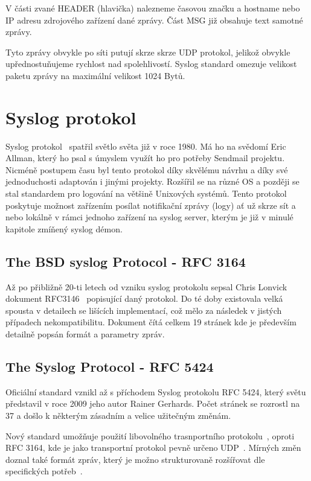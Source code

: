 \documentclass[thesis=B,czech]{FITthesis}[2012/06/26]
\begin{document}
V části zvané HEADER (hlavička) nalezneme časovou značku a hostname nebo IP adresu zdrojového zařízení dané zprávy.
Část MSG již obsahuje text samotné zprávy.

Tyto zprávy obvykle po síti putují skrze skrze UDP protokol, jelikož obvykle upřednostuňujeme rychlost nad spolehlivostí. Syslog standard omezuje velikost paketu zprávy na maximální velikost 1024 Bytů.

\section{Syslog protokol}
Syslog protokol~\cite{NetworkAdmSurGuide} spatřil světlo světa již v roce 1980. Má ho na svědomí Eric Allman, který ho psal s úmyslem využít ho pro potřeby Sendmail projektu. Nicméně postupem času byl tento protokol díky skvělému návrhu a díky své jednoduchosti adaptován i jinými projekty. Rozšířil se na různé OS a později se stal standardem pro logování na většině Unixových systémů.
Tento protokol poskytuje možnost zařízením posílat notifikační zprávy (logy) ať už skrze sít a nebo lokálně v rámci jednoho zařízení na syslog server, kterým je již v minulé kapitole zmíňený syslog démon.

\subsection{The BSD syslog Protocol - RFC 3164}
Až po přibližně 20-ti letech od vzniku syslog protokolu sepsal Chris Lonvick dokument RFC3146~\cite{RFC3164} popisující daný protokol. Do té doby existovala velká spousta v detailech se lišících implementací, což mělo za následek v jistých případech nekompatibilitu. Dokument čítá celkem 19 stránek kde je především detailně popsán formát a parametry zpráv.

\subsection{The Syslog Protocol - RFC 5424}
Oficiální standard vznikl až s příchodem Syslog protokolu RFC 5424, který světu představil v roce 2009 jeho autor Rainer Gerhards. Počet stránek se rozrostl na 37 a došlo k některým zásadním a velice užitečným změnám.

Nový standard umožňuje použití libovolného trasnportního protokolu~\cite{RFC5424-TrProt}, oproti RFC 3164, kde je jako transportní protokol pevně určeno UDP~\cite{RFC3164-UDP}.
Mírných změn doznal také formát zpráv, který je možno strukturovaně rozšířovat dle specifických potřeb~\cite{RFC5424-MsgForm}.
\end{document}
